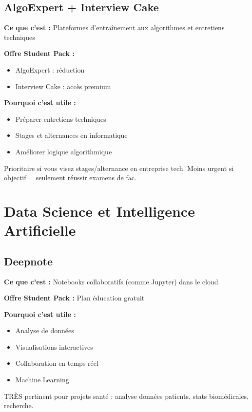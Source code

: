 \documentclass[11pt,a4paper]{article}
\begin{document}
\subsection{AlgoExpert + Interview Cake}

\textbf{Ce que c'est :} Plateformes d'entraînement aux algorithmes et entretiens techniques

\textbf{Offre Student Pack :}
\begin{itemize}
    \item AlgoExpert : réduction
    \item Interview Cake : accès premium
\end{itemize}

\textbf{Pourquoi c'est utile :}
\begin{itemize}
    \item Préparer entretiens techniques
    \item Stages et alternances en informatique
    \item Améliorer logique algorithmique
\end{itemize}

\begin{conseil}
Prioritaire si vous visez stages/alternance en entreprise tech. Moins urgent si objectif = seulement réussir examens de fac.
\end{conseil}

\newpage
\section{Data Science et Intelligence Artificielle}

\subsection{Deepnote}

\textbf{Ce que c'est :} Notebooks collaboratifs (comme Jupyter) dans le cloud

\textbf{Offre Student Pack :} Plan éducation gratuit

\textbf{Pourquoi c'est utile :}
\begin{itemize}
    \item Analyse de données
    \item Visualisations interactives
    \item Collaboration en temps réel
    \item Machine Learning
\end{itemize}

\begin{conseil}
TRÈS pertinent pour projets santé : analyse données patients, stats biomédicales, recherche.
\end{conseil}
\end{document}
